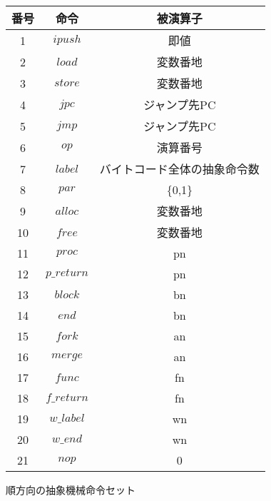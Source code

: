 \documentclass[submit,PRO]{ipsj}
\begin{document}
\begin{figure}[tb]
\caption{順方向の抽象機械命令セット}
\label{tab:forwardinstruction}
\begin{center}
\begin{tabular}[t]{|c|c|c|}\hline
番号 & 命令 & 被演算子 \\\hline
1 & $ipush$ & 即値 \\\hline
2 & $load$ & 変数番地 \\\hline
3 & $store$ &変数番地 \\\hline
4 & $jpc$&ジャンプ先PC \\\hline
5 & $jmp$&ジャンプ先PC \\\hline
6 & $op$&演算番号 \\\hline
7 & $label$&バイトコード全体の抽象命令数 \\\hline
8& $par$&\{0,1\} \\\hline
9& $alloc$&変数番地 \\\hline
10& $free$&変数番地 \\\hline
11& $proc$&pn \\\hline
12& $p\_return$&pn \\\hline
13& $block$ & bn \\\hline
14& $end$ & bn \\\hline
15& $fork$ & an \\\hline
16& $merge$ & an \\\hline
17& $func$ & fn \\\hline
18& $f\_return$ & fn \\\hline
19& $w\_label$ & wn \\\hline
20& $w\_end$ & wn \\\hline
21& $nop$ & 0 \\\hline
\end{tabular}
\end{center}
\end{figure}
\end{document}
